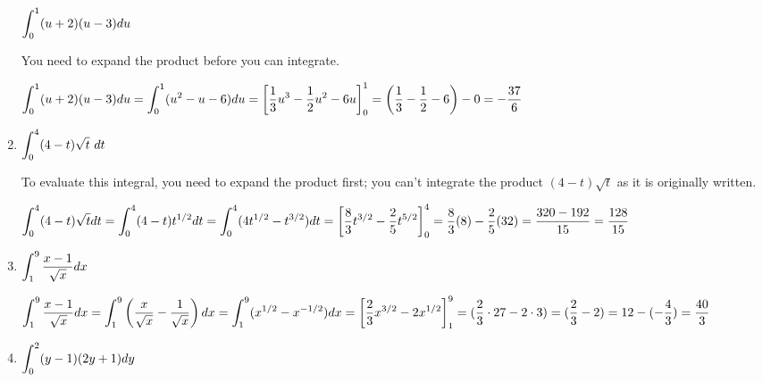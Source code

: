 \begin{enumerate}[1.]
\begin{Question}
  $\displaystyle \int_0^1 (u + 2)(u - 3) du$
\end{Question}

\begin{Solution}
  You need to expand the product before you can integrate.  

    $\displaystyle \int_0^1 (u + 2)(u - 3) du = \int_0^1 (u^2 - u - 6) du = \left[
      \frac{1}{3} u^3 - \frac{1}{2} u^2 - 6u \right]_0^1 =
    \left(\frac{1}{3} - \frac{1}{2} - 6 \right) - 0 = - \frac{37}{6}$
\end{Solution}


  \item \begin{Question}
  $\displaystyle \int_0^4 (4 - t) \sqrt{t} ~dt$
\end{Question}

\begin{Solution}
To evaluate this integral, you need to expand the product first; you can't integrate the product $(4-t)\sqrt{t}$ as it is originally written.

  $\displaystyle \int_0^4 (4 - t) \sqrt{t} dt = \int_0^4 (4 - t) t^{1 / 2} dt =
    \int_0^4 (4t^{1 / 2} - t^{3 / 2}) dt = 
    \left[ \frac{8}{3} t^{3 / 2} - \frac{2}{5} t^{5 / 2} \right]_0^4 =
    \frac{8}{3} (8) - \frac{2}{5} (32) = 
    \frac{320 - 192}{15} = \frac{128}{15}$
\end{Solution}

\item \begin{Question}
    
  $\displaystyle \int_1^9 \frac{x - 1}{\sqrt{x}} dx$
\end{Question}

\begin{Solution}
    
  $\displaystyle \int_1^9 \frac{x - 1}{\sqrt{x}} dx =
    \int_1^9 \left( \frac{x}{\sqrt{x}} - \frac{1}{\sqrt{x}} \right) dx
    = \int_1^9 (x^{1 / 2} - x^{-1 / 2}) dx =
    \left[\frac{2}{3} x^{3 / 2} - 2x^{1 / 2} \right]_1^9 = 
    (\frac{2}{3} \cdot 27 - 2 \cdot 3) = (\frac{2}{3} - 2) = 
    12 - (- \frac{4}{3}) = \frac{40}{3}$
\end{Solution}

\item \begin{Question}
    
  $\displaystyle \int_0^2 (y - 1)(2y + 1) dy$
\end{Question}

\begin{Solution}
    

\end{Solution}
\end{enumerate}
